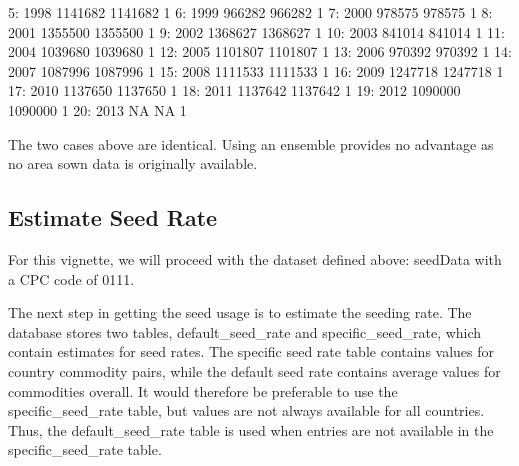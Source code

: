 \documentclass[nojss]{jss}
\begin{document}
\begin{Schunk}
\begin{Soutput}
 5: 1998  1141682       1141682                   1
 6: 1999   966282        966282                   1
 7: 2000   978575        978575                   1
 8: 2001  1355500       1355500                   1
 9: 2002  1368627       1368627                   1
10: 2003   841014        841014                   1
11: 2004  1039680       1039680                   1
12: 2005  1101807       1101807                   1
13: 2006   970392        970392                   1
14: 2007  1087996       1087996                   1
15: 2008  1111533       1111533                   1
16: 2009  1247718       1247718                   1
17: 2010  1137650       1137650                   1
18: 2011  1137642       1137642                   1
19: 2012  1090000       1090000                   1
20: 2013       NA            NA                   1
\end{Soutput}
\end{Schunk}

The two cases above are identical.  Using an ensemble provides no advantage as
no area sown data is originally available.

\subsection{Estimate Seed Rate}

For this vignette, we will proceed with the dataset defined above: seedData
with a CPC code of 0111.

The next step in getting the seed usage is to estimate the seeding rate.  The
database stores two tables, default\_seed\_rate and specific\_seed\_rate, which
contain estimates for seed rates.  The specific seed rate table contains values
for country commodity pairs, while the default seed rate contains average
values for commodities overall.  It would therefore be preferable to use the
specific\_seed\_rate table, but values are not always available for all
countries.  Thus, the default\_seed\_rate table is used when entries are not 
available in the specific\_seed\_rate table.
\end{document}
